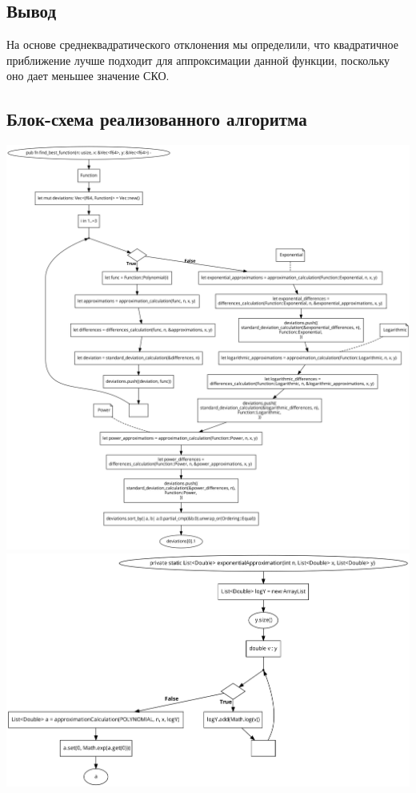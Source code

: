\documentclass{article}
\begin{document}
      \subsection{Вывод}

            На основе среднеквадратического отклонения мы определили, что квадратичное приближение лучше подходит для аппроксимации данной функции, поскольку оно дает меньшее значение СКО.

      \subsection{Блок-схема реализованного алгоритма}
             \includegraphics[scale=0.2]{best_function.png}
             \\
             \includegraphics[scale=0.2]{exp_approx.png}
\end{document}
